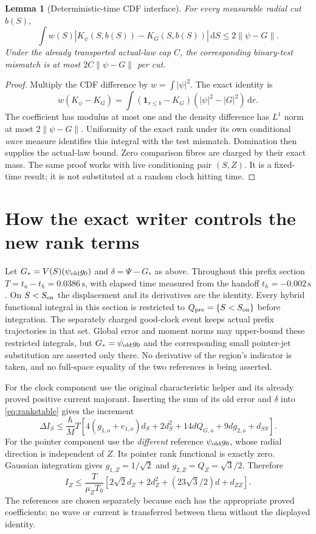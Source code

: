 \documentclass[11pt]{article}
\newtheorem{lemma}[theorem]{Lemma}
\theoremstyle{definition}\newtheorem{definition}[theorem]{Definition}
\theoremstyle{remark}\newtheorem{remark}[theorem]{Remark}
\newcommand{\norm}[1]{\left\lVert#1\right\rVert}
\newcommand{\one}{\mathbf1}\newcommand{\R}{\mathbb R}\newcommand{\T}{\mathbb T}
\newcommand{\dd}{\,\mathrm d}\newcommand{\Imv}{\operatorname{Im}}\newcommand{\ii}{\mathrm i}
\begin{document}
\begin{lemma}[Deterministic-time CDF interface]\label{lem:cdf}
For every measurable radial cut $b(S)$,
\[
 \int w(S)|K_\psi(S,b(S))-K_G(S,b(S))|\dd S\le2\norm{\psi-G}.
\]
Under the already transported actual-law cap $C$, the corresponding
binary-test mismatch is at most $2C\norm{\psi-G}$ per cut.
\end{lemma}
\begin{proof}
Multiply the CDF difference by $w=\int|\psi|^2$. The exact identity is
\[
 w(K_\psi-K_G)=\int(\one_{r\le b}-K_G)(|\psi|^2-|G|^2)\dd r.
\]
The coefficient has modulus at most one and the density difference has
$L^1$ norm at most $2\norm{\psi-G}$. Uniformity of the exact rank
under its own conditional \emph{wave} measure identifies this integral
with the test mismatch. Domination then supplies the actual-law bound.
Zero comparison fibres are charged by their exact mass. The same proof
works with live conditioning pair $(S,Z)$. It is a fixed-time result;
it is not substituted at a random clock hitting time.
\end{proof}

\section{How the exact writer controls the new rank terms}
Let $G_*=V(S)(\psi_{\rm old}g_0)$ and $\delta=\Psi-G_*$ as above.
Throughout this prefix section $T=t_a-t_h=0.0386\,\mathrm s$,
with elapsed time measured from the handoff $t_h=-0.002\,\mathrm s$.
On $S<S_{\rm on}$ the displacement and its derivatives are the identity.
Every hybrid functional integral in this section is restricted to
$Q_{\rm pre}=\{S<S_{\rm on}\}$ before integration. The separately
charged good-clock event keeps actual prefix trajectories in that set.
Global error and moment norms may upper-bound these restricted integrals,
but $G_*=\psi_{\rm old}g_0$ and the corresponding small pointer-jet
substitution are asserted only there. No derivative of the region's
indicator is taken, and no full-space equality of the two references is
being asserted.

For the clock component use the original characteristic helper and
its already proved positive current majorant. Inserting the sum of its
old error and $\delta$ into \eqref{eq:rankstable} gives the increment
\[
 \Delta I_S\le\frac\hbar M T
 [4(g_{1,o}+e_{1,o})d_S+2d_S^2+14dQ_{G,o}+9dg_{2,o}+d_{SS}].
\]
For the pointer component use the \emph{different} reference
$\psi_{\rm old}g_0$, whose radial direction is independent of $Z$.
Its pointer rank functional is exactly zero. Gaussian integration gives
$g_{1,Z}=1/\sqrt2$ and $g_{2,Z}=Q_Z=\sqrt3/2$. Therefore
\[
 I_Z\le\frac{T}{\mu_ZT_0}
 [2\sqrt2d_Z+2d_Z^2+(23\sqrt3/2)d+d_{ZZ}].
\]
The references are chosen separately because each has the appropriate
proved coefficients; no wave or current is transferred between them
without the displayed identity.
\end{document}

